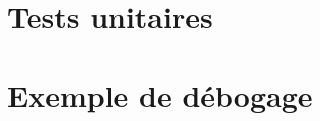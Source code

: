 \documentclass[a4paper,12pt]{article}
\begin{document}
\section{Tests unitaires}
\section{Exemple de débogage}

\end{document}
